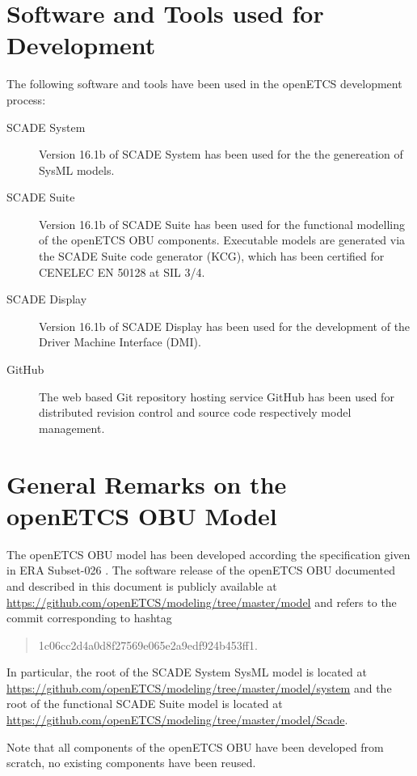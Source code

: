\section{Software and Tools used for Development}

The following software and tools have been used in the openETCS development process:
\begin{description}
\item[SCADE System] Version 16.1b of SCADE System has been used for the the genereation of SysML models.
\item[SCADE Suite] Version 16.1b of SCADE Suite has been used for the functional modelling of the openETCS OBU components. Executable models are generated via the SCADE Suite code generator (KCG), which has been certified for CENELEC EN 50128 at SIL 3/4.
\item[SCADE Display] Version 16.1b of SCADE Display has been used for the development of the Driver Machine Interface (DMI).
\item[GitHub] The web based Git repository hosting service GitHub has been used for distributed revision control and source code respectively model management.
\end{description}


\section{General Remarks on the openETCS OBU Model}
The openETCS OBU model has been developed according the specification given in ERA Subset-026 \cite{subset-026}. The software release of the openETCS OBU documented and described in this document is publicly available at \url{https://github.com/openETCS/modeling/tree/master/model} and refers to the commit corresponding to hashtag 
\begin{quotation}
1c06cc2d4a0d8f27569e065e2a9edf924b453ff1.
\end{quotation}
In particular, the root of the SCADE System SysML model is located at
\url{https://github.com/openETCS/modeling/tree/master/model/system}
and the root of the functional SCADE Suite model is located at
\url{https://github.com/openETCS/modeling/tree/master/model/Scade}.

Note that all components of the openETCS OBU have been developed from scratch, no existing components have been reused.
